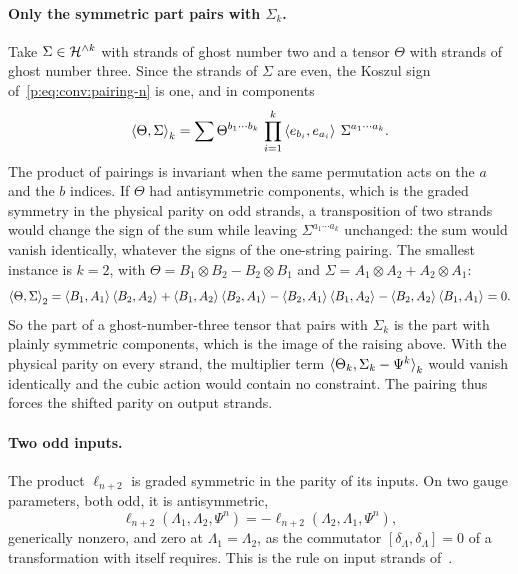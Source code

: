 \paragraph{Only the symmetric part pairs with $\Sigma_k$.}
Take $\Sigma \in \Hn{k}$ with strands of ghost number two and a tensor $\Theta$ with strands of ghost number three.
Since the strands of $\Sigma$ are even, the Koszul sign of~\eqref{p:eq:conv:pairing-n} is one, and in components
\begin{equation}
  \label{eq:conv:strands-contraction}
  \pair[k]{\Theta}{\Sigma}
    = \sum \Theta^{b_1 \cdots b_k} \, \prod_{i=1}^k \pair{e_{b_i}}{e_{a_i}} \, \Sigma^{a_1 \cdots a_k}.
\end{equation}
The product of pairings is invariant when the same permutation acts on the $a$ and the $b$ indices.
If $\Theta$ had antisymmetric components, which is the graded symmetry in the physical parity on odd strands, a transposition of two strands would change the sign of the sum while leaving $\Sigma^{a_1 \cdots a_k}$ unchanged: the sum would vanish identically, whatever the signs of the one-string pairing.
The smallest instance is $k = 2$, with $\Theta = B_1 \otimes B_2 - B_2 \otimes B_1$ and $\Sigma = A_1 \otimes A_2 + A_2 \otimes A_1$:
\begin{equation}
  \pair[2]{\Theta}{\Sigma}
    = \pair{B_1}{A_1} \pair{B_2}{A_2}
      + \pair{B_1}{A_2} \pair{B_2}{A_1}
      - \pair{B_2}{A_1} \pair{B_1}{A_2}
      - \pair{B_2}{A_2} \pair{B_1}{A_1}
    = 0.
\end{equation}
So the part of a ghost-number-three tensor that pairs with $\Sigma_k$ is the part with plainly symmetric components, which is the image of the raising above.
With the physical parity on every strand, the multiplier term $\pair[k]{\Theta_k}{\Sigma_k - \Psi^k}$ would vanish identically and the cubic action would contain no constraint.
The pairing thus forces the shifted parity on output strands.

\paragraph{Two odd inputs.}
The product $\ell_{n+2}$ is graded symmetric in the parity of its inputs.
On two gauge parameters, both odd, it is antisymmetric,
\begin{equation}
  \ell_{n+2}(\Lambda_1, \Lambda_2, \Psi^n)
    = - \ell_{n+2}(\Lambda_2, \Lambda_1, \Psi^n),
\end{equation}
generically nonzero, and zero at $\Lambda_1 = \Lambda_2$, as the commutator $[\delta_\Lambda, \delta_\Lambda] = 0$ of a transformation with itself requires.
This is the rule on input strands of~\cite{Erler:2014:NSNSSectorClosed}.

